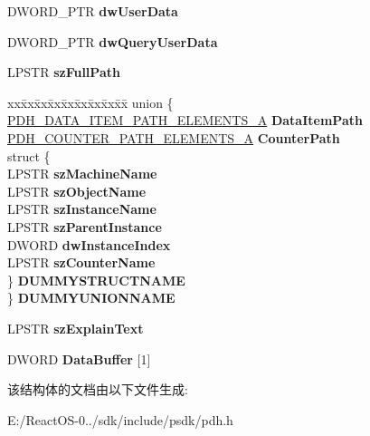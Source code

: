 \begin{DoxyCompactItemize}
D\+W\+O\+R\+D\+\_\+\+P\+TR {\bfseries dw\+User\+Data}
\item 
\mbox{\label{struct___p_d_h___c_o_u_n_t_e_r___i_n_f_o___a_a465f847df64c70d1260a132eecd09456}} 
D\+W\+O\+R\+D\+\_\+\+P\+TR {\bfseries dw\+Query\+User\+Data}
\item 
\mbox{\label{struct___p_d_h___c_o_u_n_t_e_r___i_n_f_o___a_a595b48ae900caa0789d6e8ae8a825ed2}} 
L\+P\+S\+TR {\bfseries sz\+Full\+Path}
\item 
\mbox{\label{struct___p_d_h___c_o_u_n_t_e_r___i_n_f_o___a_a160bdd8cc07df28040b5191a1e4c8314}} 
\begin{tabbing}
xx\=xx\=xx\=xx\=xx\=xx\=xx\=xx\=xx\=\kill
union \{\\
\>\hyperlink{struct___p_d_h___d_a_t_a___i_t_e_m___p_a_t_h___e_l_e_m_e_n_t_s___a}{PDH\_DATA\_ITEM\_PATH\_ELEMENTS\_A} {\bfseries DataItemPath}\\
\>\hyperlink{struct___p_d_h___c_o_u_n_t_e_r___p_a_t_h___e_l_e_m_e_n_t_s___a}{PDH\_COUNTER\_PATH\_ELEMENTS\_A} {\bfseries CounterPath}\\
\>struct \{\\
\>\>LPSTR {\bfseries szMachineName}\\
\>\>LPSTR {\bfseries szObjectName}\\
\>\>LPSTR {\bfseries szInstanceName}\\
\>\>LPSTR {\bfseries szParentInstance}\\
\>\>DWORD {\bfseries dwInstanceIndex}\\
\>\>LPSTR {\bfseries szCounterName}\\
\>\} {\bfseries DUMMYSTRUCTNAME}\\
\} {\bfseries DUMMYUNIONNAME}\\

\end{tabbing}\item 
\mbox{\label{struct___p_d_h___c_o_u_n_t_e_r___i_n_f_o___a_af26a9019ddb246299e8ba3636c24a224}} 
L\+P\+S\+TR {\bfseries sz\+Explain\+Text}
\item 
\mbox{\label{struct___p_d_h___c_o_u_n_t_e_r___i_n_f_o___a_ae8dc6e1215ad75ee0890df51450cf08a}} 
D\+W\+O\+RD {\bfseries Data\+Buffer} \mbox{[}1\mbox{]}
\end{DoxyCompactItemize}


该结构体的文档由以下文件生成\+:\begin{DoxyCompactItemize}
\item 
E\+:/\+React\+O\+S-\/0../sdk/include/psdk/pdh.\+h\end{DoxyCompactItemize}
